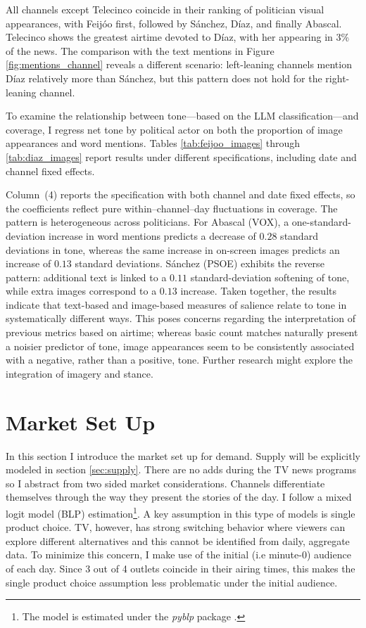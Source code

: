 \documentclass[12pt]{article}
\begin{document}
All channels except Telecinco coincide in their ranking of politician visual appearances, with Feijóo first, followed by Sánchez, Díaz, and finally Abascal. Telecinco shows the greatest airtime devoted to Díaz, with her appearing in 3\% of the news. The comparison with the text mentions in Figure \ref{fig:mentions_channel} reveals a different scenario: left-leaning channels mention Díaz relatively more than Sánchez, but this pattern does not hold for the right-leaning channel.

To examine the relationship between tone—based on the LLM classification—and coverage, I regress net tone by political actor on both the proportion of image appearances and word mentions. Tables \ref{tab:feijoo_images} through \ref{tab:diaz_images} report results under different specifications, including date and channel fixed effects.

Column~(4) reports the specification with both channel and date fixed effects, so the coefficients reflect pure within–channel–day fluctuations in coverage. The pattern is heterogeneous across politicians. For Abascal (VOX), a one-standard-deviation increase in word mentions predicts a decrease of $0.28$ standard deviations in tone, whereas the same increase in on-screen images predicts an increase of $0.13$ standard deviations. Sánchez (PSOE) exhibits the reverse pattern: additional text is linked to a $0.11$ standard-deviation softening of tone, while extra images correspond to a $0.13$ increase. Taken together, the results indicate that text-based and image-based measures of salience relate to tone in systematically different ways. This poses concerns regarding the interpretation of previous metrics based on airtime; whereas basic count matches naturally present a noisier predictor of tone, image appearances seem to be consistently associated with a negative, rather than a positive, tone. Further research might explore the integration of imagery and stance.



	
	
	
	\section{Market Set Up}\label{section:market}
	
In this section I introduce the market set up for demand. Supply will be explicitly modeled in section \ref{sec:supply}. There are no adds during the TV news programs so I abstract from two sided market considerations. Channels differentiate themselves through the way they present the stories of the day. I follow a mixed logit model \citep{berry_blp} (BLP) estimation\footnote{The model is estimated under the \textit{pyblp} package \citep{conlon2020best}.}. A key assumption in this type of models is single product choice. TV, however, has strong switching behavior where viewers can explore different alternatives and this cannot be identified from daily, aggregate data. To minimize this concern, I make use of the initial (i.e minute-0) audience of each day. Since 3 out of 4 outlets coincide in their airing times, this makes the single product choice assumption less problematic under the initial audience. 
\end{document}
